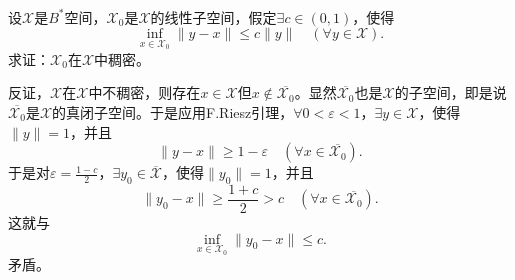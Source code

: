 \begin{exercise}
\hfill\\
设$\mathscr{X}$是$B^*$空间，$\mathscr{X}_0$是$\mathscr{X}$的线性子空间，假定$\exists c\in(0,1)$，使得
\begin{equation}
\inf_{x\in\mathscr{X}_0}\|y-x\|\leq c\|y\|\quad(\forall y\in\mathscr{X}).
\end{equation}
求证：$\mathscr{X}_0$在$\mathscr{X}$中稠密。

反证，$\mathscr{X}$在$\mathscr{X}$中不稠密，则存在$x\in\mathscr{X}$但$x\not\in\overline{\mathscr{X}_0}$。显然$\overline{\mathscr{X}_0}$也是$\mathscr{X}$的子空间，即是说$\overline{\mathscr{X}_0}$是$\mathscr{X}$的真闭子空间。于是应用F.Riesz引理，$\forall0<\varepsilon<1$，$\exists y\in\mathscr{X}$，使得$\|y\|=1$，并且$$\|y-x\|\geq1-\varepsilon\quad(\forall x\in\overline{\mathscr{X}_0}).$$
于是对$\varepsilon=\frac{1-c}{2}$，$\exists y_0\in\overline{\mathscr{X}}$，使得$\|y_0\|=1$，并且
$$\|y_0-x\|\geq\frac{1+c}{2}>c\quad(\forall x\in\overline{\mathscr{X}_0}).$$
这就与$$\inf_{x\in\mathscr{X}_0}\|y_0-x\|\leq c.$$
矛盾。
\end{exercise}

